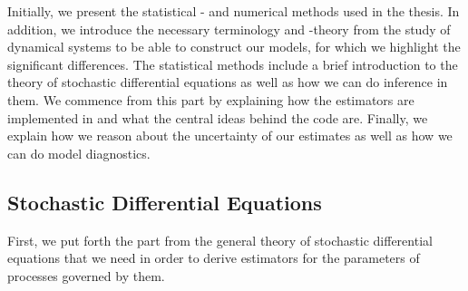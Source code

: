 Initially, we present the statistical - and numerical methods used in the thesis. In addition, we introduce the necessary terminology and -theory from the study of dynamical systems to be able to construct our models, for which we highlight the significant differences. The statistical methods include a brief introduction to the theory of stochastic differential equations as well as how we can do inference in them. We commence from this part by explaining how the estimators are implemented in  and what the central ideas behind the code are. Finally, we explain how we reason about the uncertainty of our estimates as well as how we can do model diagnostics.
\subsection{Stochastic Differential Equations}
First, we put forth the part from the general theory of stochastic differential equations that we need in order to derive estimators for the parameters of processes governed by them. 
